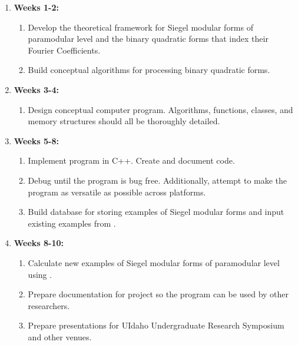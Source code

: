 \documentclass[11pt, oneside]{amsart}
\begin{document}
\begin{enumerate}

\item \textbf{Weeks 1-2:}

\begin{enumerate}

\item Develop the theoretical framework for Siegel modular forms of paramodular level and the binary quadratic forms that index their Fourier Coefficients.
\item Build conceptual algorithms for processing binary quadratic forms.

\end{enumerate}
\item \textbf{Weeks 3-4:} 

\begin{enumerate}

\item Design conceptual computer program. Algorithms, functions, classes, and memory structures should all be thoroughly detailed.

\end{enumerate}

\item \textbf{Weeks 5-8:}

\begin{enumerate}

\item Implement program in C++. Create and document code.
\item Debug until the program is bug free. Additionally, attempt to make the program as versatile as possible across platforms.
\item Build database for storing examples of Siegel modular forms and input existing examples from \cite{LMFDB}.

\end{enumerate}

\item \textbf{Weeks 8-10:}

\begin{enumerate}

\item Calculate new examples of Siegel modular forms of paramodular level using \cite{JR1, JR2}.
\item Prepare documentation for project so the program can be used by other researchers.
\item Prepare presentations for UIdaho Undergraduate Research Symposium and other venues.

\end{enumerate}

\end{enumerate}
\end{document}
